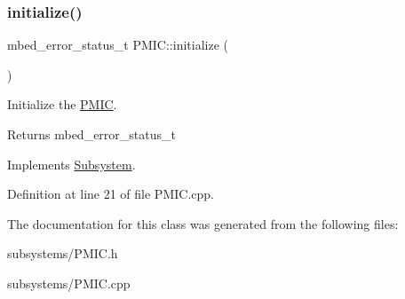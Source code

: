 \subsubsection{\texorpdfstring{initialize()}{initialize()}}
{\footnotesize\ttfamily mbed\+\_\+error\+\_\+status\+\_\+t P\+M\+I\+C\+::initialize (\begin{DoxyParamCaption}{ }\end{DoxyParamCaption})\hspace{0.3cm}{\ttfamily [virtual]}}



Initialize the \mbox{\hyperlink{class_p_m_i_c}{P\+M\+IC}}. 

\begin{DoxyReturn}{Returns}
mbed\+\_\+error\+\_\+status\+\_\+t 
\end{DoxyReturn}


Implements \mbox{\hyperlink{class_subsystem_afa43e7c1c8b49e514b944f517d4dc905}{Subsystem}}.



Definition at line 21 of file P\+M\+I\+C.\+cpp.



The documentation for this class was generated from the following files\+:\begin{DoxyCompactItemize}
\item 
subsystems/P\+M\+I\+C.\+h\item 
subsystems/P\+M\+I\+C.\+cpp\end{DoxyCompactItemize}
